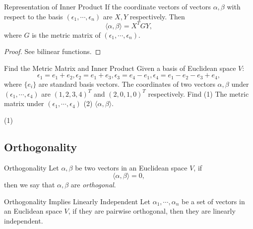 \begin{proposition}{Representation of Inner Product}{}
  If the coordinate vectors of vectors $\alpha, \beta$ with respect to the basis
  $(\epsilon_1,\cdots,\epsilon_n)$ are $X, Y$ respectively.
  Then 
  \begin{equation}
    \langle \alpha, \beta \rangle = X^TGY,
  \end{equation}
  where $G$ is the metric matrix of $(\epsilon_1,\cdots,\epsilon_n)$.
\end{proposition}

\begin{proof}
  See bilinear functions.
\end{proof}

\begin{example}{Find the Metric Matrix and Inner Product}{}
  Given a basis of Euclidean space $V$:
  \begin{equation}
    \epsilon_1=e_1+e_2,\epsilon_2=e_1+e_3,\epsilon_3=e_4-e_1,\epsilon_4=e_1-e_2-e_3+e_4,
  \end{equation}
  where $\{e_i\}$ are standard basis vectors.
  The coordinates of two vectors $\alpha, \beta$ under
  $(\epsilon_1,\cdots,\epsilon_4)$ are $(1,2,3,4)^T$ and $(2,0,1,0)^T$ respectively.
  Find (1) The metric matrix under $(\epsilon_1,\cdots,\epsilon_4)$
  (2) $\langle \alpha, \beta \rangle$.
\end{example}

\begin{solution}
  (1)
\end{solution}

\subsection{Orthogonality}

\begin{definition}{Orthogonality}{}
  Let $\alpha, \beta$ be two vectors in an Euclidean space $V$,
  if
  \begin{equation}
    \langle \alpha, \beta \rangle = 0,
  \end{equation}
  then we say that $\alpha, \beta$ are \emph{orthogonal}.
\end{definition}

\begin{proposition}{Orthogonality Implies Linearly Independent}{}
  Let $\alpha_1,\cdots,\alpha_n$ be a set of vectors in an Euclidean space $V$,
  if they are pairwise orthogonal, then they are linearly independent.
\end{proposition}

